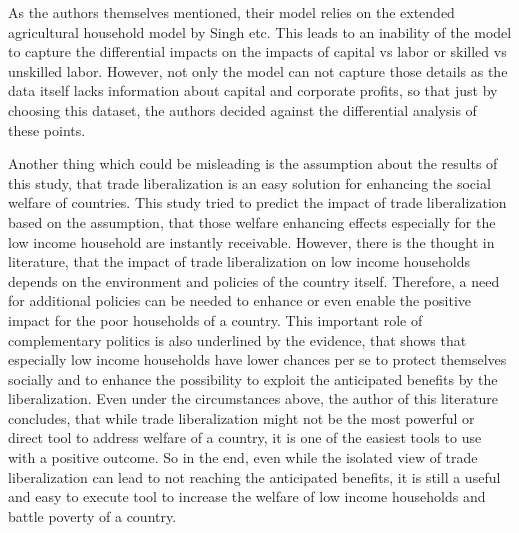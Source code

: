 As the authors themselves mentioned, their model relies on the extended agricultural household model by Singh etc. This leads
to an inability of the model to capture the differential impacts on the impacts of capital vs labor or skilled vs unskilled
labor. However, not only the model can not capture those details as the data itself lacks information about capital and corporate
profits, so that just by choosing this dataset, the authors decided against the differential analysis of these points.

Another thing which could be misleading is the assumption about the results of this study, that trade liberalization is an
easy solution for enhancing the social welfare of countries. This study tried to predict the impact of trade liberalization
based on the assumption, that those welfare enhancing effects especially for the low income household are instantly receivable.
However, there is the thought in literature, that the impact of trade liberalization on low income households depends on the
environment and policies of the country itself. Therefore, a need for additional policies can be needed to enhance or even
enable the positive impact for the poor households of a country. This important role of complementary politics is also underlined
by the evidence, that shows that especially low income households have lower chances per se to protect themselves socially and
to enhance the possibility to exploit the anticipated benefits by the liberalization. 
Even under the circumstances above, the author of this literature concludes, that while trade liberalization might not be 
the most powerful or direct tool to address welfare of a country, it is one of the easiest tools to use with a positive outcome.
So in the end, even while the isolated view of trade liberalization can lead to not reaching the anticipated benefits, it is
still a useful and easy to execute tool to increase the welfare of low income households and battle poverty of a country.\\

